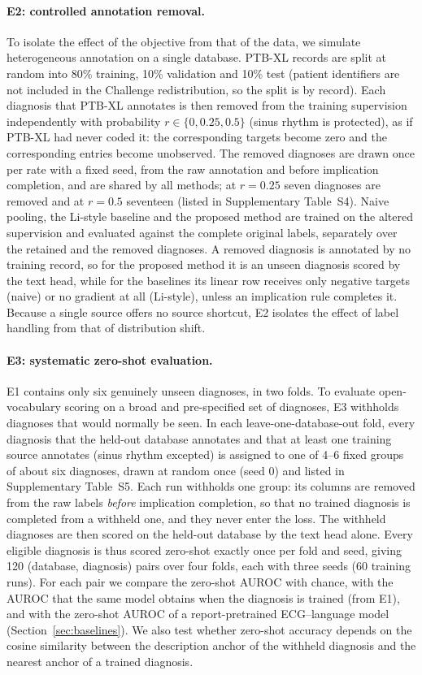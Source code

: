 \paragraph{E2: controlled annotation removal.}
To isolate the effect of the objective from that of the data, we simulate heterogeneous annotation on a single database. PTB-XL records are split at random into 80\% training, 10\% validation and 10\% test (patient identifiers are not included in the Challenge redistribution, so the split is by record). Each diagnosis that PTB-XL annotates is then removed from the training supervision independently with probability $r\in\{0,0.25,0.5\}$ (sinus rhythm is protected), as if PTB-XL had never coded it: the corresponding targets become zero and the corresponding entries become unobserved. The removed diagnoses are drawn once per rate with a fixed seed, from the raw annotation and before implication completion, and are shared by all methods; at $r=0.25$ seven diagnoses are removed and at $r=0.5$ seventeen (listed in Supplementary Table~S4). Naive pooling, the Li-style baseline and the proposed method are trained on the altered supervision and evaluated against the complete original labels, separately over the retained and the removed diagnoses. A removed diagnosis is annotated by no training record, so for the proposed method it is an unseen diagnosis scored by the text head, while for the baselines its linear row receives only negative targets (naive) or no gradient at all (Li-style), unless an implication rule completes it. Because a single source offers no source shortcut, E2 isolates the effect of label handling from that of distribution shift.

\paragraph{E3: systematic zero-shot evaluation.}
E1 contains only six genuinely unseen diagnoses, in two folds. To evaluate open-vocabulary scoring on a broad and pre-specified set of diagnoses, E3 withholds diagnoses that would normally be seen. In each leave-one-database-out fold, every diagnosis that the held-out database annotates and that at least one training source annotates (sinus rhythm excepted) is assigned to one of 4--6 fixed groups of about six diagnoses, drawn at random once (seed 0) and listed in Supplementary Table~S5. Each run withholds one group: its columns are removed from the raw labels \emph{before} implication completion, so that no trained diagnosis is completed from a withheld one, and they never enter the loss. The withheld diagnoses are then scored on the held-out database by the text head alone. Every eligible diagnosis is thus scored zero-shot exactly once per fold and seed, giving 120 (database, diagnosis) pairs over four folds, each with three seeds (60 training runs). For each pair we compare the zero-shot AUROC with chance, with the AUROC that the same model obtains when the diagnosis is trained (from E1), and with the zero-shot AUROC of a report-pretrained ECG--language model (Section~\ref{sec:baselines}). We also test whether zero-shot accuracy depends on the cosine similarity between the description anchor of the withheld diagnosis and the nearest anchor of a trained diagnosis.

